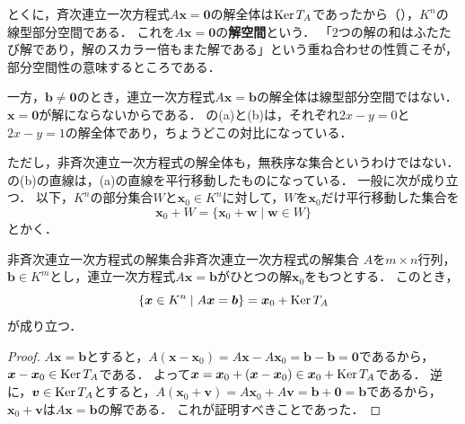 とくに，斉次連立一次方程式$A\bm{x} = \bm{0}$の解全体は$\operatorname{Ker} T_A$であったから（），$K^n$の線型部分空間である．
これを$A\bm{x} = \bm{0}$の\textbf{解空間}という．
「$2$つの解の和はふたたび解であり，解のスカラー倍もまた解である」という重ね合わせの性質こそが，部分空間性の意味するところである．

一方，$\bm{b}\ne\bm{0}$のとき，連立一次方程式$A\bm{x}=\bm{b}$の解全体は線型部分空間ではない．
$\bm{x}=\bm{0}$が解にならないからである．
の(a)と(b)は，それぞれ$2x-y=0$と$2x-y=1$の解全体であり，ちょうどこの対比になっている．

ただし，非斉次連立一次方程式の解全体も，無秩序な集合というわけではない．
の(b)の直線は，(a)の直線を平行移動したものになっている．
一般に次が成り立つ．
以下，$K^n$の部分集合$W$と$\bm{x}_0 \in K^n$に対して，$W$を$\bm{x}_0$だけ平行移動した集合を
\[
  \bm{x}_0 + W = \{\bm{x}_0 + \bm{w} \mid \bm{w} \in W\}
\]
とかく．

\begin{prop}{非斉次連立一次方程式の解集合}{非斉次連立一次方程式の解集合}
  $A$を$m \times n$行列，$\bm{b} \in K^m$とし，連立一次方程式$A\bm{x} = \bm{b}$がひとつの解$\bm{x}_0$をもつとする．
  このとき，
  \[
    \{\bm{x} \in K^n \mid A\bm{x} = \bm{b}\} = \bm{x}_0 + \operatorname{Ker} T_A
  \]
  が成り立つ．
\end{prop}

\begin{tleftbar}
\begin{proof}
  $A\bm{x} = \bm{b}$とすると，$A(\bm{x} - \bm{x}_0) = A\bm{x} - A\bm{x}_0 = \bm{b} - \bm{b} = \bm{0}$であるから，$\bm{x} - \bm{x}_0 \in \operatorname{Ker} T_A$である．
  よって$\bm{x} = \bm{x}_0 + (\bm{x} - \bm{x}_0) \in \bm{x}_0 + \operatorname{Ker} T_A$である．
  逆に，$\bm{v} \in \operatorname{Ker} T_A$とすると，$A(\bm{x}_0 + \bm{v}) = A\bm{x}_0 + A\bm{v} = \bm{b} + \bm{0} = \bm{b}$であるから，$\bm{x}_0 + \bm{v}$は$A\bm{x} = \bm{b}$の解である．
  これが証明すべきことであった．
\end{proof}
\end{tleftbar}

